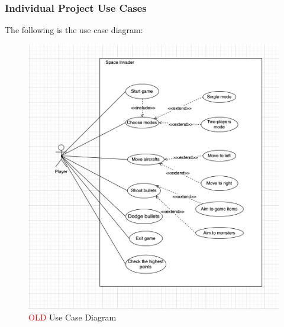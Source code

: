\documentclass[12pt]{article}
\begin{document}
\subsubsection{Individual Project Use Cases}
The following is the use case diagram:
\begin{figure}[h!]
\begin{center}
\includegraphics[scale=1]{Use_Case.png}
\end{center}
\caption{\textcolor{red}{OLD} Use Case Diagram}
\end{figure}
\newpage
\end{document}
